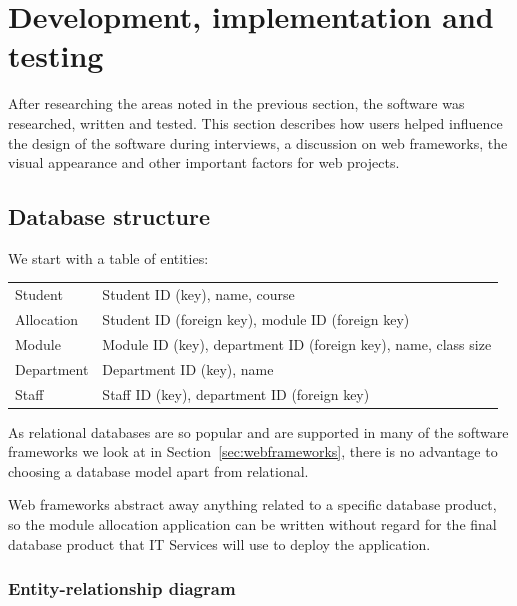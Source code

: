 \documentclass[]{scrartcl}
\begin{document}
\section{Development, implementation and testing}
\label{sec:implementation}


After researching the areas noted in the previous section, the software was
researched, written and tested. This section describes how users helped
influence the design of the software during interviews, a discussion on web
frameworks, the visual appearance and other important factors for web
projects.

\subsection{Database structure}

We start with a table of entities:

\begin{tabular}{ l l }
  Student    & Student ID (key), name, course \\
  Allocation & Student ID (foreign key), module ID (foreign key) \\
  Module     & Module ID (key), department ID (foreign key), name, class size \\
  Department & Department ID (key), name \\
  Staff      & Staff ID (key), department ID (foreign key) \\
\end{tabular}

As relational databases are so popular and are supported in many of the
software frameworks we look at in Section~\ref{sec:webframeworks}, there is no
advantage to choosing a database model apart from relational.

Web frameworks abstract away anything related to a specific database product,
so the module allocation application can be written without regard for the
final database product that IT Services will use to deploy the application.

\subsubsection{Entity-relationship diagram}


\end{document}
